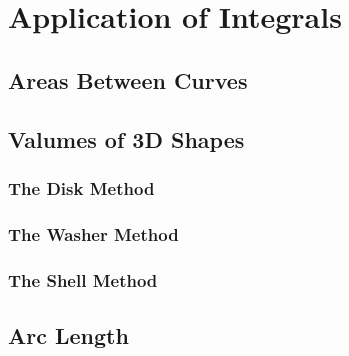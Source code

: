 \chapter{Application of Integrals}

\section{Areas Between Curves}

\section{Valumes of 3D Shapes}
\subsection{The Disk Method}
\subsection{The Washer Method}
\subsection{The Shell Method}

\section{Arc Length}

